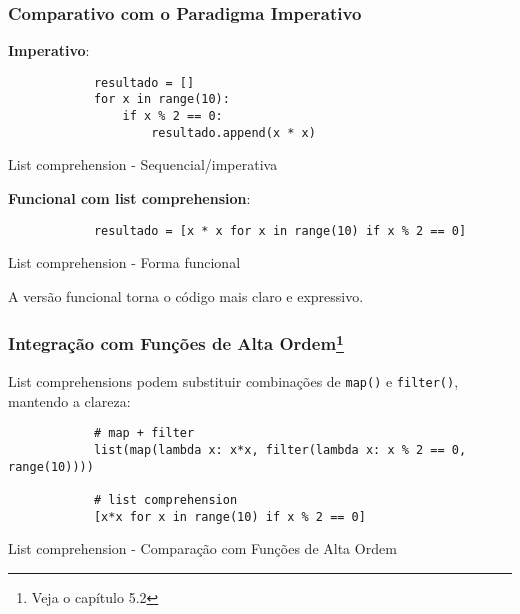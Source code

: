 \documentclass[date,twocolumn,a4paper]{ppgem}
\begin{document}
    \subsubsection{Comparativo com o Paradigma Imperativo}
    \textbf{Imperativo}:

    \begin{listing}[!ht]
        \begin{verbatim}
            resultado = []
            for x in range(10):
                if x % 2 == 0:
                    resultado.append(x * x)
        \end{verbatim}
        \caption{List comprehension - Sequencial/imperativa}
        \label{listing:2}
    \end{listing}
    \textbf{Funcional com list comprehension}:
    \begin{listing}[!ht]
        \begin{verbatim}
            resultado = [x * x for x in range(10) if x % 2 == 0]
        \end{verbatim}
        \caption{List comprehension - Forma funcional}
        \label{listing:2}
    \end{listing}

    A versão funcional torna o código mais claro e expressivo.
    \subsubsection{Integração com Funções de Alta Ordem\footnote{Veja o capítulo 5.2}}
    List comprehensions podem substituir combinações de \texttt{map()} e \texttt{filter()}, mantendo a clareza:

    \begin{listing}[!ht]
        \begin{verbatim}
            # map + filter
            list(map(lambda x: x*x, filter(lambda x: x % 2 == 0, range(10))))

            # list comprehension
            [x*x for x in range(10) if x % 2 == 0]
        \end{verbatim}
        \caption{List comprehension - Comparação com Funções de Alta Ordem}
        \label{listing:2}
    \end{listing}
\end{document}
